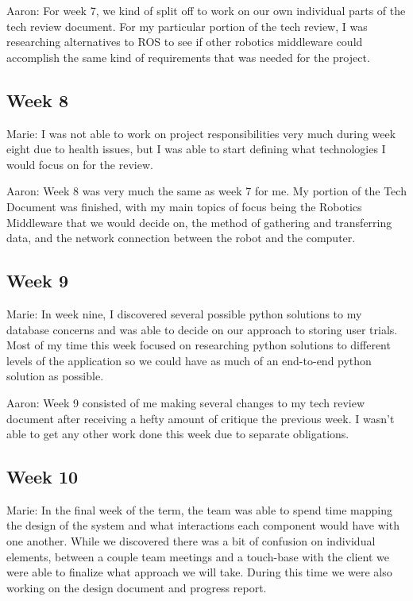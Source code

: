\documentclass[onecolumn, draftclsnofoot,10pt, compsoc]{IEEEtran}
\begin{document}
Aaron: For week 7, we kind of split off to work on our own individual parts of the tech review document. For my particular portion of the tech review, I was researching alternatives to ROS to see if other robotics middleware could accomplish the same kind of requirements that was needed for the project.\par

\subsection{Week 8}
Marie: I was not able to work on project responsibilities very much during week eight due to health issues, but I was able to start defining what technologies I would focus on for the review.\par

Aaron: Week 8 was very much the same as week 7 for me. My portion of the Tech Document was finished, with my main topics of focus being the Robotics Middleware that we would decide on, the method of gathering and transferring data, and the network connection between the robot and the computer.\par

\subsection{Week 9}
Marie: In week nine, I discovered several possible python solutions to my database concerns and was able to decide on our approach to storing user trials. Most of my time this week focused on researching python solutions to different levels of the application so we could have as much of an end-to-end python solution as possible.\par

Aaron: Week 9 consisted of me making several changes to my tech review document after receiving a hefty amount of critique the previous week. I wasn't able to get any other work done this week due to separate obligations.\par

\subsection{Week 10}
Marie: In the final week of the term, the team was able to spend time mapping the design of the system and what interactions each component would have with one another. While we discovered there was a bit of confusion on individual elements, between a couple team meetings and a touch-base with the client we were able to finalize what approach we will take. During this time we were also working on the design document and progress report.\par
\end{document}
